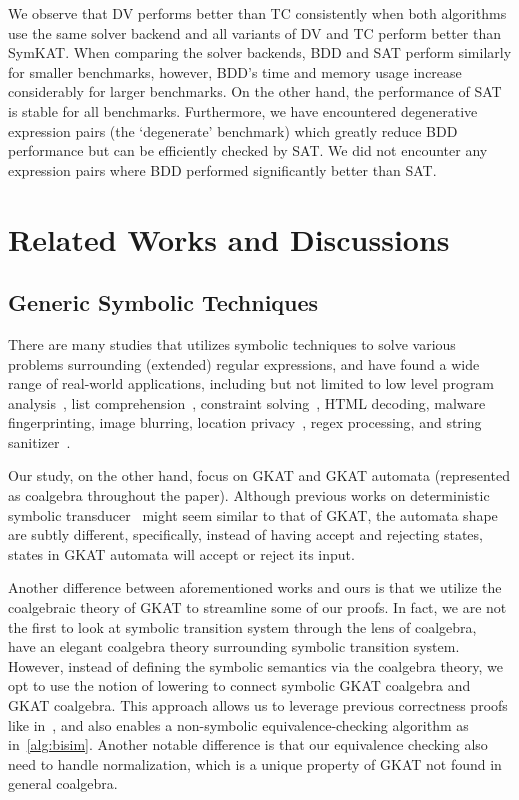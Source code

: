 \documentclass[conference]{IEEEtran}
\begin{document}
We observe that DV performs better than TC consistently when both algorithms use the same solver backend and all variants of DV and TC perform better than SymKAT. When comparing the solver backends, BDD and SAT perform similarly for smaller benchmarks, however, BDD's time and memory usage increase considerably for larger benchmarks. On the other hand, the performance of SAT is stable for all benchmarks. Furthermore, we have encountered degenerative expression pairs (the `degenerate' benchmark) which greatly reduce BDD performance but can be efficiently checked by SAT. We did not encounter any expression pairs where BDD performed significantly better than SAT.

\section{Related Works and Discussions}

\subsection{Generic Symbolic Techniques}

There are many studies that utilizes symbolic techniques to solve various problems surrounding (extended) regular expressions, and have found a wide range of real-world applications, including but not limited to low level program analysis~\cite{dallapreda_AbstractSymbolicAutomata_2015a}, list comprehension~\cite{saarikivi_FusingEffectfulComprehensions_2017}, constraint solving~\cite{stanford_SymbolicBooleanDerivatives_2021}, HTML decoding, malware fingerprinting, image blurring, location privacy~\cite{veanes_SymbolicFiniteState_2012}, regex processing, and string sanitizer~\cite{veanes_ApplicationsSymbolicFinite_2013}.

Our study, on the other hand,  focus on GKAT and GKAT automata (represented as coalgebra throughout the paper). 
Although previous works on deterministic symbolic transducer~\cite{saarikivi_FusingEffectfulComprehensions_2017,veanes_SymbolicFiniteState_2012} might seem similar to that of GKAT, the automata shape are subtly different, specifically, instead of having accept and rejecting states, states in GKAT automata will accept or reject its input.

Another difference between aforementioned works and ours is that we utilize the coalgebraic theory of GKAT to streamline some of our proofs.
In fact, we are not the first to look at symbolic transition system through the lens of coalgebra, \citeauthor{bonchi_CoalgebraicSymbolicSemantics_2009}~\cite{bonchi_CoalgebraicSymbolicSemantics_2009} have an elegant coalgebra theory surrounding symbolic transition system.
However, instead of defining the symbolic semantics via the coalgebra theory, we opt to use the notion of lowering to connect symbolic GKAT coalgebra and GKAT coalgebra.
This approach allows us to leverage previous correctness proofs like in~, and also enables a non-symbolic equivalence-checking algorithm as in~\cref{alg:bisim}.
Another notable difference is that our equivalence checking also need to handle normalization, which is a unique property of GKAT not found in general coalgebra.
\end{document}
